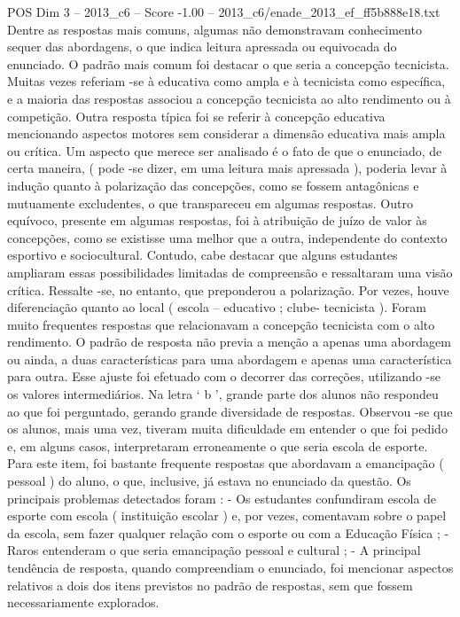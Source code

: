 \begin{textsample}{POS Dim 3 – 2013\_c6 – Score -1.00 – 2013\_c6/enade\_2013\_ef\_ff5b888e18.txt}
Dentre as respostas mais comuns, algumas não demonstravam conhecimento sequer das abordagens, o que indica leitura apressada ou equivocada do enunciado.
O padrão mais comum foi destacar o que seria a concepção tecnicista.
Muitas vezes referiam -se à educativa como ampla e à tecnicista como específica, e a maioria das respostas associou a concepção tecnicista ao alto rendimento ou à competição.
Outra resposta típica foi se referir à concepção educativa mencionando aspectos motores sem considerar a dimensão educativa mais ampla ou crítica.
Um aspecto que merece ser analisado é o fato de que o enunciado, de certa maneira, ( pode -se dizer, em uma leitura mais apressada ), poderia levar à indução quanto à polarização das concepções, como se fossem antagônicas e mutuamente excludentes, o que transpareceu em algumas respostas.
Outro equívoco, presente em algumas respostas, foi à atribuição de juízo de valor às concepções, como se existisse uma melhor que a outra, independente do contexto esportivo e sociocultural.
Contudo, cabe destacar que alguns estudantes ampliaram essas possibilidades limitadas de compreensão e ressaltaram uma visão crítica.
Ressalte -se, no entanto, que preponderou a polarização.
Por vezes, houve diferenciação quanto ao local ( escola – educativo ; clube- tecnicista ).
Foram muito frequentes respostas que relacionavam a concepção tecnicista com o alto rendimento.
O padrão de resposta não previa a menção a apenas uma abordagem ou ainda, a duas características para uma abordagem e apenas uma característica para outra.
Esse ajuste foi efetuado com o decorrer das correções, utilizando -se os valores intermediários.
Na letra ‘ b ’, grande parte dos alunos não respondeu ao que foi perguntado, gerando grande diversidade de respostas.
Observou -se que os alunos, mais uma vez, tiveram muita dificuldade em entender o que foi pedido e, em alguns casos, interpretaram erroneamente o que seria escola de esporte.
Para este item, foi bastante frequente respostas que abordavam a emancipação ( pessoal ) do aluno, o que, inclusive, já estava no enunciado da questão.
Os principais problemas detectados foram : - Os estudantes confundiram escola de esporte com escola ( instituição escolar ) e, por vezes, comentavam sobre o papel da escola, sem fazer qualquer relação com o esporte ou com a Educação Física ; - Raros entenderam o que seria emancipação pessoal e cultural ; - A principal tendência de resposta, quando compreendiam o enunciado, foi mencionar aspectos relativos a dois dos itens previstos no padrão de respostas, sem que fossem necessariamente explorados.

\end{textsample}
